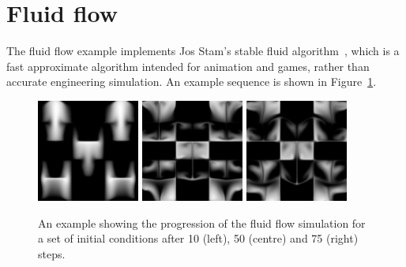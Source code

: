 \section{Fluid flow}
\label{sec:fluid}

The fluid flow example implements Jos Stam's stable fluid
algorithm~\cite{Stam:1999ey}, which is a fast approximate algorithm intended for
animation and games, rather than accurate engineering simulation. An example
sequence is shown in Figure~\ref{fig:fluid_steps}.

\begin{figure}
    \begin{center}
        \includegraphics[width=0.3\textwidth]{images/results/fluid/fluid-10}
        \includegraphics[width=0.3\textwidth]{images/results/fluid/fluid-50}
        \includegraphics[width=0.3\textwidth]{images/results/fluid/fluid-75}
    \end{center}
    \caption[Example of the fluid flow simulation]{An example showing the
        progression of the fluid flow simulation for a set of initial conditions
        after 10 (left), 50 (centre) and 75 (right) steps.}
    \label{fig:fluid_steps}
\end{figure}

